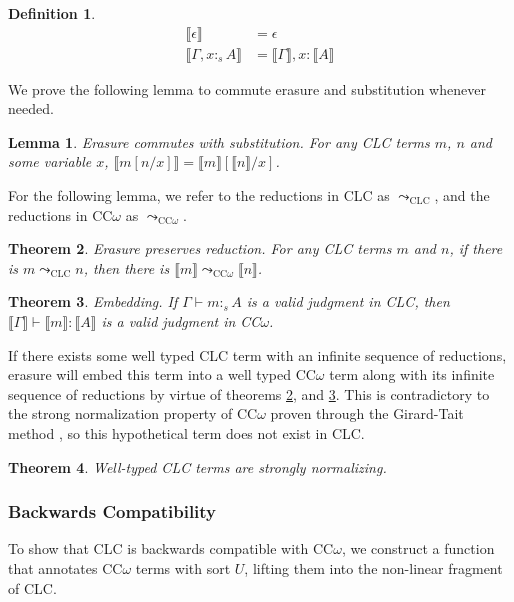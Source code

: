 \documentclass[sigplan,screen,review,authordraft]{acmart}
\newtheorem{theorem}{Theorem}[section]
\newtheorem{lemma}[theorem]{Lemma}
\theoremstyle{definition}
\newtheorem{definition}{Definition}[section]
\newcommand{\stype}[1]{:_#1}
\newcommand{\step}{\leadsto}
\newcommand{\erase}[1]{\llbracket #1 \rrbracket}
\begin{document}
  \begin{definition}
    \begin{align*}
      \erase{\epsilon} &= \epsilon \\
      \erase{\Gamma, x \stype{s} A} &= \erase{\Gamma}, x : \erase{A}
    \end{align*}
  \end{definition}

  We prove the following lemma to commute erasure and substitution whenever needed.
  \begin{lemma} 
    Erasure commutes with substitution. For any CLC terms $m$, $n$ and some variable $x$, $\erase{m[n/x]} = \erase{m}[\erase{n}/x]$. 
  \end{lemma}

  For the following lemma, we refer to the reductions in CLC as $\step_{\scriptscriptstyle \text{CLC}}$, and the reductions in CC$\omega$ as $\step_{\scriptscriptstyle \text{CC$\omega$}}$.
  \begin{theorem} \label{preserve} 
    Erasure preserves reduction. For any CLC terms $m$ and $n$, if there is $m \step_{\scriptscriptstyle \text{CLC}} n$, then there is $\erase{m} \step_{\scriptscriptstyle \text{CC$\omega$}} \erase{n}$.
  \end{theorem}

  \begin{theorem} \label{embedding} 
    Embedding. If $\Gamma \vdash m \stype{s} A$ is a valid judgment in CLC, then $\erase{\Gamma} \vdash \erase{m} : \erase{A}$ is a valid judgment in CC$\omega$.
  \end{theorem}

  If there exists some well typed CLC term with an infinite sequence of reductions, erasure will embed this term into a well typed CC$\omega$ term along with its infinite sequence of reductions by virtue of theorems \ref{preserve}, and \ref{embedding}. This is contradictory to the strong normalization property of CC$\omega$ proven through the Girard-Tait method \cite{ecc}, so this hypothetical term does not exist in CLC.

  \begin{theorem}
    Well-typed CLC terms are strongly normalizing.
  \end{theorem}

  \subsubsection{Backwards Compatibility}
  To show that CLC is backwards compatible with CC$\omega$, we construct a function that annotates CC$\omega$ terms with sort $U$, lifting them into the non-linear fragment of CLC.
\end{document}
